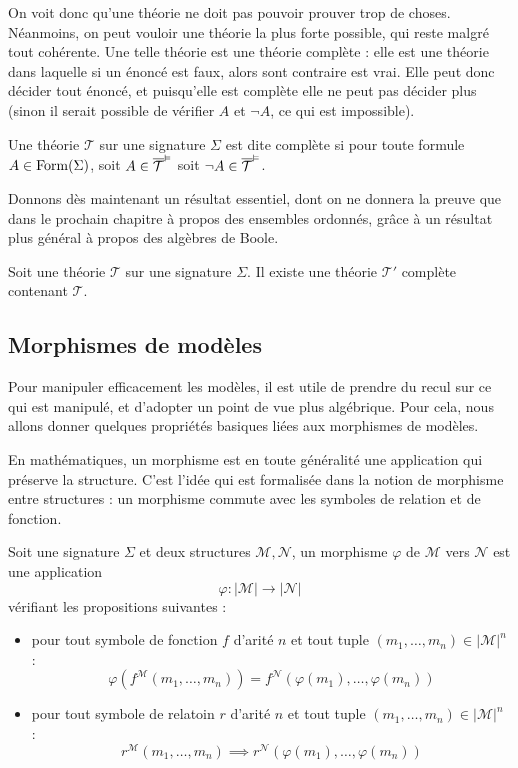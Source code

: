 On voit donc qu'une théorie ne doit pas pouvoir prouver trop de choses.
Néanmoins, on peut vouloir une théorie la plus forte possible, qui reste malgré
tout cohérente. Une telle théorie est une théorie complète : elle est une théorie
dans laquelle si un énoncé est faux, alors sont contraire est vrai. Elle peut
donc décider tout énoncé, et puisqu'elle est complète elle ne peut pas décider
plus (sinon il serait possible de vérifier $A$ et $\lnot A$, ce qui est
impossible).

\begin{definition}
  Une théorie $\mathcal T$ sur une signature $\Sigma$ est dite complète si pour
  toute formule $A\in\operatorname{Form}(\Sigma)$, soit $A\in \overline{\mathcal T}^{\vDash}$ soit
  $\lnot A \in \overline{\mathcal T}^{\vDash}$.
\end{definition}

Donnons dès maintenant un résultat essentiel, dont on ne donnera la preuve que
dans le prochain chapitre à propos des ensembles ordonnés, grâce à un résultat
plus général à propos des algèbres de Boole.

\begin{theorem}\label{thm.completion}
  Soit une théorie $\mathcal T$ sur une signature $\Sigma$. Il existe une théorie
  $\mathcal T'$ complète contenant $\mathcal T$.
\end{theorem}

\subsection{Morphismes de modèles}

Pour manipuler efficacement les modèles, il est utile de prendre du recul sur ce
qui est manipulé, et d'adopter un point de vue plus algébrique. Pour cela, nous
allons donner quelques propriétés basiques liées aux morphismes de modèles.

En mathématiques, un morphisme est en toute généralité une application qui
préserve la structure. C'est l'idée qui est formalisée dans la notion de
morphisme entre structures : un morphisme commute avec les symboles de relation
et de fonction.

\begin{definition}
  Soit une signature $\Sigma$ et deux structures $\mathcal M,\mathcal N$, un
  morphisme $\varphi$ de $\mathcal M$ vers $\mathcal N$ est une application
  \[\varphi : |\mathcal M|\longrightarrow |\mathcal N|\]
  vérifiant les propositions suivantes :
  \begin{itemize}
  \item pour tout symbole de fonction $f$ d'arité $n$ et tout tuple
    $(m_1,\ldots,m_n)\in|\mathcal M|^n$ :
    \[\varphi(f^{\mathcal M}(m_1,\ldots,m_n))
    = f^{\mathcal N}(\varphi(m_1),\ldots,\varphi(m_n))\]
  \item pour tout symbole de relatoin $r$ d'arité $n$ et tout tuple
    $(m_1,\ldots,m_n)\in|\mathcal M|^n$ :
    \[r^{\mathcal M}(m_1,\ldots,m_n) \implies
    r^{\mathcal N}(\varphi(m_1),\ldots,\varphi(m_n)) \]
  \end{itemize}
\end{definition}

